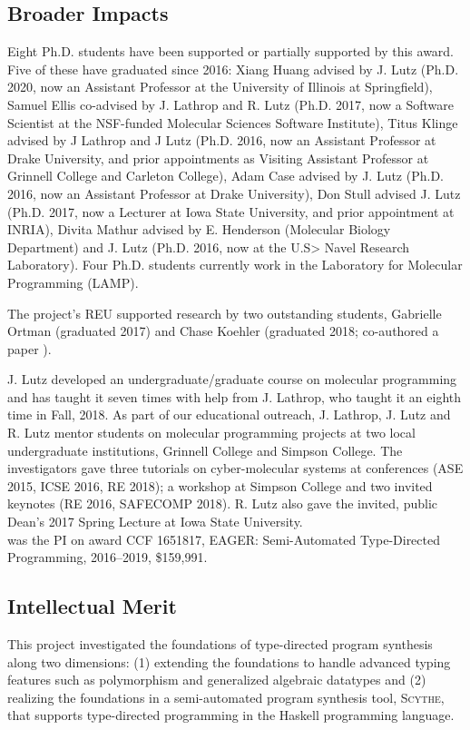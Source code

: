 \subsection*{Broader Impacts}
Eight Ph.D. students have been supported or partially supported by this award. Five of these have graduated since 2016:  Xiang Huang advised by J. Lutz (Ph.D. 2020, now an Assistant Professor at the University of Illinois at Springfield), Samuel Ellis co-advised by J. Lathrop and R. Lutz (Ph.D. 2017, now a Software Scientist at the NSF-funded Molecular Sciences Software Institute), Titus Klinge advised by J Lathrop and J Lutz  (Ph.D. 2016, now an Assistant Professor at Drake University, and prior appointments as Visiting Assistant Professor at Grinnell College and Carleton College), Adam Case advised by J. Lutz (Ph.D. 2016, now an Assistant Professor at Drake University), Don Stull advised J. Lutz (Ph.D. 2017, now a Lecturer at Iowa State University, and prior appointment at INRIA), Divita Mathur advised by E. Henderson (Molecular Biology Department) and J. Lutz (Ph.D. 2016, now at the U.S> Navel Research Laboratory).  Four Ph.D. students currently work in the Laboratory for Molecular Programming (LAMP).  

The project's REU supported research by two outstanding students, Gabrielle Ortman (graduated 2017)  and Chase Koehler (graduated 2018; co-authored a paper \cite{cKMHL18}).

J. Lutz developed  an undergraduate/graduate course on molecular programming and has taught it seven times with help from J. Lathrop, who taught it an eighth time in Fall, 2018.  As part of our educational outreach, J. Lathrop, J. Lutz and R. Lutz mentor students on molecular programming projects at two local undergraduate institutions, Grinnell College and Simpson College.
The investigators gave three tutorials on cyber-molecular systems at conferences (ASE 2015, ICSE 2016, RE 2018); a workshop at Simpson College and two invited keynotes (RE 2016, SAFECOMP 2018).
R. Lutz also gave the invited, public Dean's 2017 Spring Lecture at Iowa State University. \\

 was the PI on award CCF 1651817, EAGER: Semi-Automated Type-Directed Programming, 2016--2019, \$159,991.
%
\subsection*{Intellectual Merit}
This project investigated the foundations of type-directed program synthesis along two dimensions: (1) extending the foundations to handle advanced typing features such as polymorphism and generalized algebraic datatypes and (2) realizing the foundations in a semi-automated program synthesis tool, \textsc{Scythe}, that supports type-directed programming in the Haskell programming language.

